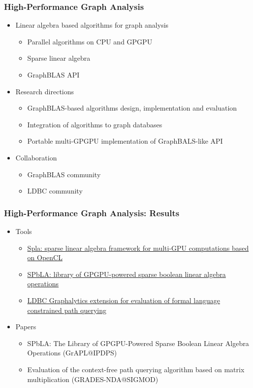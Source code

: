 \documentclass[xcolor=table,aspectratio=169]{beamer}
\begin{document}
\begin{frame}[fragile]
  \frametitle{High-Performance Graph Analysis}
  \begin{itemize}
    \item Linear algebra based algorithms for graph analysis
    \begin{itemize}
      \item Parallel algorithms on CPU and GPGPU
      \item Sparse linear algebra
      \item GraphBLAS API
    \end{itemize} 
    \pause
    \item Research directions
    \begin{itemize}
      \item GraphBLAS-based algorithms design, implementation and evaluation      
      \item Integration of algorithms to graph databases
      \item Portable multi-GPGPU implementation of GraphBALS-like API            
    \end{itemize}
    \pause
    \item Collaboration
    \begin{itemize}
      \item GraphBLAS community
      \item LDBC community
    \end{itemize}

  \end{itemize}
\end{frame}


\begin{frame}[fragile]
  \frametitle{High-Performance Graph Analysis: Results}
    \begin{itemize}
      \item Tools
      \begin{itemize}
        \item \href{https://github.com/JetBrains-Research/spla}{Spla: sparse linear algebra framework for multi-GPU computations based on OpenCL}
        \item \href{https://github.com/JetBrains-Research/spbla}{SPbLA: library of GPGPU-powered sparse boolean linear algebra operations}    
        \item \href{https://github.com/JetBrains-Research/ldbc_graphalytics}{LDBC Graphalytics extension for evaluation of formal language constrained path querying}    
      \end{itemize}
      \item Papers 
      \begin{itemize}
        \item SPbLA: The Library of GPGPU-Powered Sparse Boolean Linear Algebra Operations (GrAPL@IPDPS)
        \item Evaluation of the context-free path querying algorithm based on matrix multiplication (GRADES-NDA@SIGMOD)
      \end{itemize} 
    \end{itemize}
\end{frame}
\end{document}
